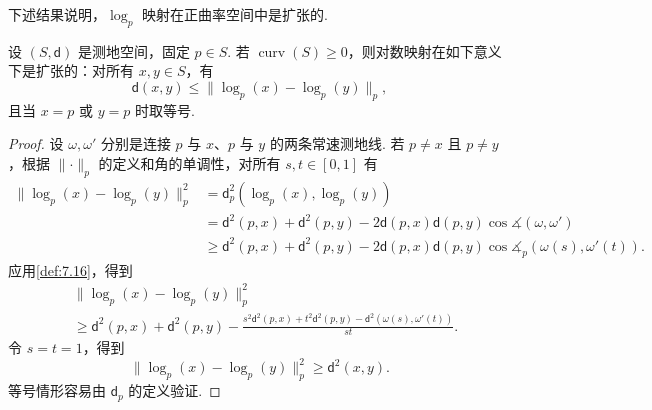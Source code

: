 下述结果说明，$\log_p$ 映射在正曲率空间中是扩张的.
\begin{proposition}\label{prop:7.21}
设 $(S,\mathsf d)$ 是测地空间，固定 $p\in S$. 若 $\operatorname{curv}(S)\ge0$，则对数映射在如下意义下是扩张的：对所有 $x,y\in S$，有
$$\mathsf d(x,y)\le\lVert\log_p(x)-\log_p(y)\rVert_p,$$
且当 $x=p$ 或 $y=p$ 时取等号.
\end{proposition}
\begin{proof}
设 $\omega,\omega'$ 分别是连接 $p$ 与 $x$、$p$ 与 $y$ 的两条常速测地线. 若 $p\ne x$ 且 $p\ne y$，根据 $\lVert\cdot\rVert_p$ 的定义和角的单调性，对所有 $s,t\in[0,1]$ 有
$$\begin{aligned}
\lVert\log_p(x)-\log_p(y)\rVert_p^2
&=\mathsf d_p^2(\log_p(x),\log_p(y))\\
&=\mathsf d^2(p,x)+\mathsf d^2(p,y)-2\mathsf d(p,x)\mathsf d(p,y)\cos\measuredangle(\omega,\omega')\\
&\ge\mathsf d^2(p,x)+\mathsf d^2(p,y)-2\mathsf d(p,x)\mathsf d(p,y)\cos\measuredangle_p(\omega(s),\omega'(t)).
\end{aligned}$$
应用\autoref{def:7.16}，得到
$$\begin{aligned}
&\lVert\log_p(x)-\log_p(y)\rVert_p^2\\
&\ge\mathsf d^2(p,x)+\mathsf d^2(p,y)
-\frac{s^2\mathsf d^2(p,x)+t^2\mathsf d^2(p,y)-\mathsf d^2(\omega(s),\omega'(t))}{st}.
\end{aligned}$$
令 $s=t=1$，得到
$$\lVert\log_p(x)-\log_p(y)\rVert_p^2\ge\mathsf d^2(x,y).$$
等号情形容易由 $\mathsf d_p$ 的定义验证.
\end{proof}

